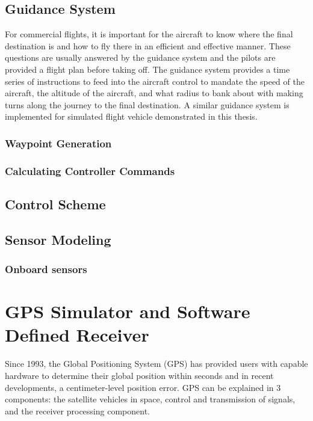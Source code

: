 \documentclass[12pt]{report}
\begin{document}
\section{Guidance System}
For commercial flights, it is important for the aircraft to know where the final destination is and how to fly there in an efficient and effective manner. These questions are usually answered by the guidance system and the pilots are provided a flight plan before taking off. The guidance system provides a time series of instructions to feed into the aircraft control to mandate the speed of the aircraft, the altitude of the aircraft, and what radius to bank about with making turns along the journey to the final destination. A similar guidance system is implemented for simulated flight vehicle demonstrated in this thesis.

\subsection{Waypoint Generation}

\subsection{Calculating Controller Commands}


\section{Control Scheme}

\section{Sensor Modeling}
\subsection{Onboard sensors}

\chapter{GPS Simulator and Software Defined Receiver}
Since 1993, the Global Positioning System (GPS) has provided users with capable hardware to determine their global position within seconds and in recent developments, a centimeter-level position error. GPS can be explained in 3 components: the satellite vehicles in space, control and transmission of signals, and the receiver processing component.
\end{document}
